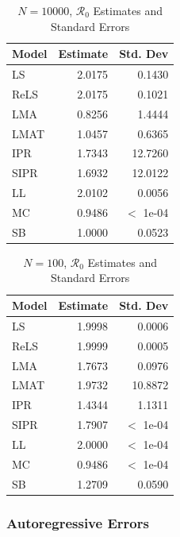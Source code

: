 \documentclass[12pt]{article}
\newcommand{\rr}{\ensuremath{\mathcal{R}_0}}
\begin{document}
\begin{table}[H]
	
	\centering
	\begin{tabular}[t]{l|r|r}
		\hline
		Model & Estimate & Std. Dev\\
		\hline
		LS & 2.0175 & 0.1430\\
		\hline
		ReLS & 2.0175 & 0.1021\\
		\hline
		LMA & 0.8256 & 1.4444\\
		\hline
		LMAT & 1.0457 & 0.6365\\
		\hline
		IPR & 1.7343 & 12.7260\\
		\hline
		SIPR & 1.6932 & 12.0122\\
		\hline
		LL & 2.0102 & 0.0056\\
		\hline
		MC & 0.9486 & $<$ 1e-04\\
		\hline
		SB & 1.0000 & 0.0523\\
		\hline
	\end{tabular}
	\caption{$N = 10000$, $\rr$ Estimates and Standard Errors}
\end{table}

\begin{table}[H]
	
	\centering
	\begin{tabular}[t]{l|r|r}
		\hline
		Model & Estimate & Std. Dev\\
		\hline
		LS & 1.9998 & 0.0006\\
		\hline
		ReLS & 1.9999 & 0.0005\\
		\hline
		LMA & 1.7673 & 0.0976\\
		\hline
		LMAT & 1.9732 & 10.8872\\
		\hline
		IPR & 1.4344 & 1.1311\\
		\hline
		SIPR & 1.7907 & $<$ 1e-04\\
		\hline
		LL & 2.0000 & $<$ 1e-04\\
		\hline
		MC & 0.9486 & $<$ 1e-04\\
		\hline
		SB & 1.2709 & 0.0590\\
		\hline
	\end{tabular}
	\caption{$N = 100$, $\rr$ Estimates and Standard Errors}
\end{table}

\subsubsection{Autoregressive Errors}
\end{document}
